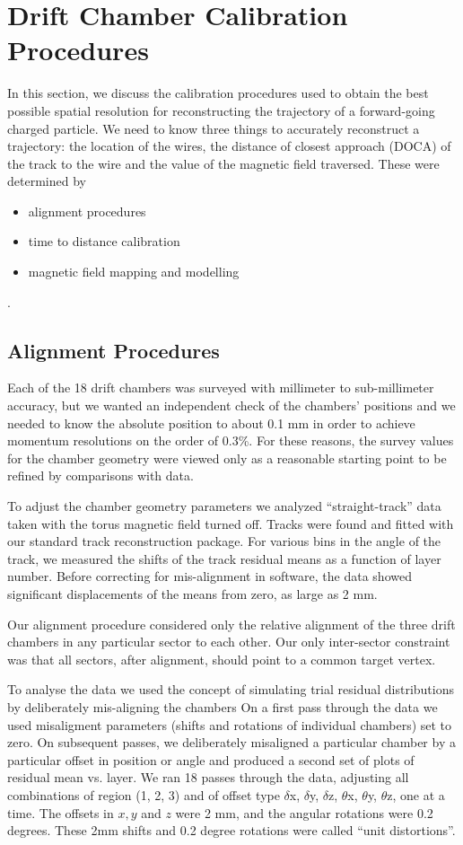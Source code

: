 \section{Drift Chamber Calibration Procedures}
In this section, we discuss the calibration procedures used to obtain the 
best possible spatial resolution for reconstructing the trajectory of
a forward-going charged particle.  We need to know three things to 
accurately reconstruct a trajectory: the location of the wires, the
distance of closest approach (DOCA) of the track to the wire and the
value of the magnetic field traversed.  These were determined by
\begin{itemize}
\item alignment procedures
\item time to distance calibration
\item magnetic field mapping and modelling
\end{itemize}.  


\subsection{Alignment Procedures}
\label{align}

Each of the 18 drift chambers was 
surveyed with millimeter to sub-millimeter
accuracy, but we wanted an independent check of the chambers' positions and 
we needed to know the absolute position to about 0.1 mm in order to 
achieve momentum resolutions on the order of 0.3\%.  For 
these reasons, the survey values for the chamber geometry were viewed only as 
a reasonable starting point to be refined by comparisons with data.

To adjust the chamber geometry parameters we analyzed
``straight-track'' data taken with the torus magnetic field turned off.  
Tracks were found and fitted with our standard track reconstruction package.
For various bins in the angle of the track, we measured the shifts of the
track residual means as a function of layer number. 
Before correcting for mis-alignment in software, the data showed significant 
displacements of the means from zero, as large as 2 mm.  

Our alignment procedure considered only the relative alignment of the
three drift chambers in any particular sector to each other.
Our only inter-sector constraint was that all sectors, after alignment,
should point to a common target vertex.

To analyse the data we used the concept of simulating trial residual
distributions by deliberately mis-aligning the chambers
On a first pass through
the data we used misaligment parameters (shifts and rotations of individual
chambers) set to zero.  On subsequent passes, we deliberately misaligned
a particular chamber by a particular offset in position or angle and 
produced a second set of plots of residual mean vs. layer.  We ran 18 passes
through the data, adjusting all combinations of region (1, 2, 3) and
of offset type $\delta$x, $\delta$y, $\delta$z, $\theta$x, 
$\theta$y, $\theta$z, one at
a time.  The offsets in $x, y$ and $z$ were 2 mm, and the angular rotations
were 0.2 degrees.  These 2mm shifts and 0.2 degree rotations were
called ``unit distortions''.

